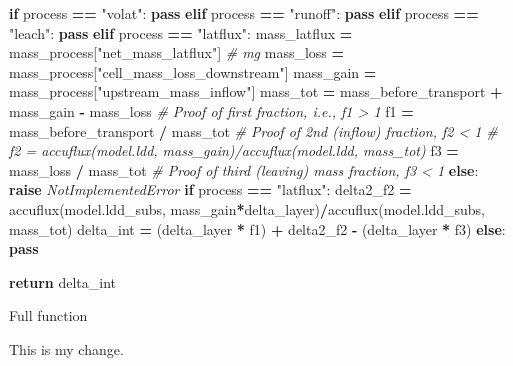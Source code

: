 \documentclass[]{article}
\newenvironment{Shaded}{\begin{snugshade}}{\end{snugshade}}
\newcommand{\StringTok}[1]{\textcolor[rgb]{0.31,0.60,0.02}{#1}}
\newcommand{\CommentTok}[1]{\textcolor[rgb]{0.56,0.35,0.01}{\textit{#1}}}
\newcommand{\ControlFlowTok}[1]{\textcolor[rgb]{0.13,0.29,0.53}{\textbf{#1}}}
\newcommand{\OperatorTok}[1]{\textcolor[rgb]{0.81,0.36,0.00}{\textbf{#1}}}
\newcommand{\PreprocessorTok}[1]{\textcolor[rgb]{0.56,0.35,0.01}{\textit{#1}}}
\newcommand{\NormalTok}[1]{#1}
\begin{document}
\begin{Shaded}
\begin{Highlighting}[]
    \ControlFlowTok{if}\NormalTok{ process }\OperatorTok{==} \StringTok{"volat"}\NormalTok{:}
        \ControlFlowTok{pass}
    \ControlFlowTok{elif}\NormalTok{ process }\OperatorTok{==} \StringTok{"runoff"}\NormalTok{:}
        \ControlFlowTok{pass}
    \ControlFlowTok{elif}\NormalTok{ process }\OperatorTok{==} \StringTok{"leach"}\NormalTok{:}
        \ControlFlowTok{pass}
    \ControlFlowTok{elif}\NormalTok{ process }\OperatorTok{==} \StringTok{"latflux"}\NormalTok{:}
\NormalTok{        mass_latflux }\OperatorTok{=}\NormalTok{ mass_process[}\StringTok{"net_mass_latflux"}\NormalTok{]  }\CommentTok{# mg}
\NormalTok{        mass_loss }\OperatorTok{=}\NormalTok{ mass_process[}\StringTok{"cell_mass_loss_downstream"}\NormalTok{]}
\NormalTok{        mass_gain }\OperatorTok{=}\NormalTok{ mass_process[}\StringTok{"upstream_mass_inflow"}\NormalTok{]}
\NormalTok{        mass_tot }\OperatorTok{=}\NormalTok{ mass_before_transport }\OperatorTok{+}\NormalTok{ mass_gain }\OperatorTok{-}\NormalTok{ mass_loss}
        \CommentTok{# Proof of first fraction, i.e., f1 > 1}
\NormalTok{        f1 }\OperatorTok{=}\NormalTok{ mass_before_transport }\OperatorTok{/}\NormalTok{ mass_tot}
        \CommentTok{# Proof of 2nd (inflow) fraction, f2 < 1}
        \CommentTok{# f2 = accuflux(model.ldd, mass_gain)/accuflux(model.ldd, mass_tot)}
\NormalTok{        f3 }\OperatorTok{=}\NormalTok{ mass_loss }\OperatorTok{/}\NormalTok{ mass_tot  }\CommentTok{# Proof of third (leaving) mass fraction, f3 < 1}
    \ControlFlowTok{else}\NormalTok{:}
        \ControlFlowTok{raise} \PreprocessorTok{NotImplementedError}
    \ControlFlowTok{if}\NormalTok{ process }\OperatorTok{==} \StringTok{"latflux"}\NormalTok{:}
\NormalTok{        delta2_f2 }\OperatorTok{=}\NormalTok{ accuflux(model.ldd_subs, mass_gain}\OperatorTok{*}\NormalTok{delta_layer)}\OperatorTok{/}\NormalTok{accuflux(model.ldd_subs, mass_tot)}
\NormalTok{        delta_int }\OperatorTok{=}\NormalTok{ (delta_layer }\OperatorTok{*}\NormalTok{ f1) }\OperatorTok{+}\NormalTok{ delta2_f2 }\OperatorTok{-}\NormalTok{ (delta_layer }\OperatorTok{*}\NormalTok{ f3)}
    \ControlFlowTok{else}\NormalTok{:}
        \ControlFlowTok{pass}
        
    \ControlFlowTok{return}\NormalTok{ delta_int}
                       
\end{Highlighting}
\end{Shaded}

Full function

This is my change.
\end{document}
